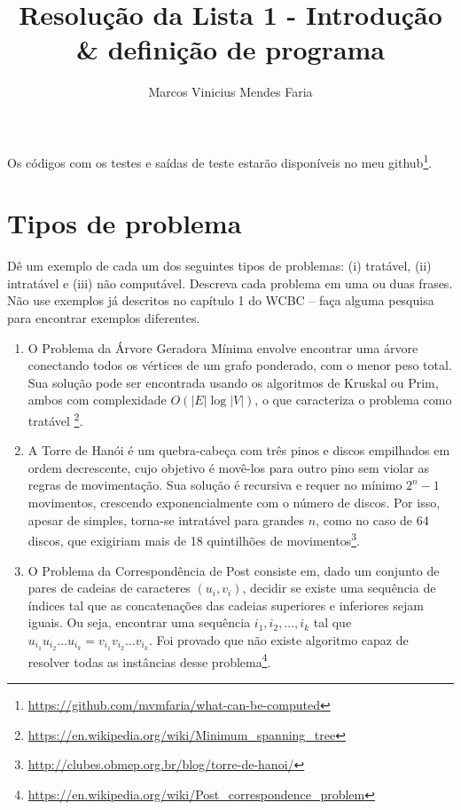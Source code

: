 \documentclass[9pt,a4paper,twocolumn,twoside]{tau-class/tau}
\title{Resolução da Lista 1 - Introdução \& definição de programa}
\author{Marcos Vinicius Mendes Faria}
\affil{Instituto Federal de Educação, Ciência e Tecnologia do Espírito Santo}
\begin{document}
		
    \maketitle 
    \thispagestyle{firststyle} 
    
Os códigos com os testes e saídas de teste estarão disponíveis no meu github\footnote{\url{https://github.com/mvmfaria/what-can-be-computed}}.
\section{Tipos de problema}

    \begin{tauenv}[frametitle= Exemplos de Tipos de Problemas]
            Dê um exemplo de cada um dos seguintes tipos de problemas: (i) tratável, (ii) intratável e (iii) não
            computável. Descreva cada problema em uma ou duas frases. Não use exemplos já descritos no capítulo
            1 do WCBC – faça alguma pesquisa para encontrar exemplos diferentes.
    \end{tauenv}

    \begin{enumerate}
        \item O Problema da Árvore Geradora Mínima envolve encontrar uma árvore conectando todos os vértices de um grafo ponderado, com o menor peso total.  
        Sua solução pode ser encontrada usando os algoritmos de Kruskal ou Prim, ambos com complexidade \(O(|E|\log|V|)\), o que caracteriza o problema como tratável \footnote{\url{https://en.wikipedia.org/wiki/Minimum_spanning_tree}}.
        \newline
    
        \item A Torre de Hanói é um quebra-cabeça com três pinos e discos empilhados em ordem decrescente, cujo objetivo é movê-los para outro pino sem violar as regras de movimentação. Sua solução é recursiva e requer no mínimo $2^n - 1$ movimentos, crescendo exponencialmente com o número de discos. Por isso, apesar de simples, torna-se intratável para grandes $n$, como no caso de 64 discos, que exigiriam mais de 18 quintilhões de movimentos\footnote{\url{http://clubes.obmep.org.br/blog/torre-de-hanoi/}}.
        \newline
    
        \item O Problema da Correspondência de Post consiste em, dado um conjunto de pares de cadeias de caracteres \((u_i, v_i)\), decidir se existe uma sequência de índices tal que as concatenações das cadeias superiores e inferiores sejam iguais. Ou seja, encontrar uma sequência \(i_1, i_2, \dots, i_k\) tal que \(u_{i_1}u_{i_2}\dots u_{i_k} = v_{i_1}v_{i_2}\dots v_{i_k}\). Foi provado que não existe algoritmo capaz de resolver todas as instâncias desse problema\footnote{\url{https://en.wikipedia.org/wiki/Post_correspondence_problem}}.

    \end{enumerate}
\end{document}
